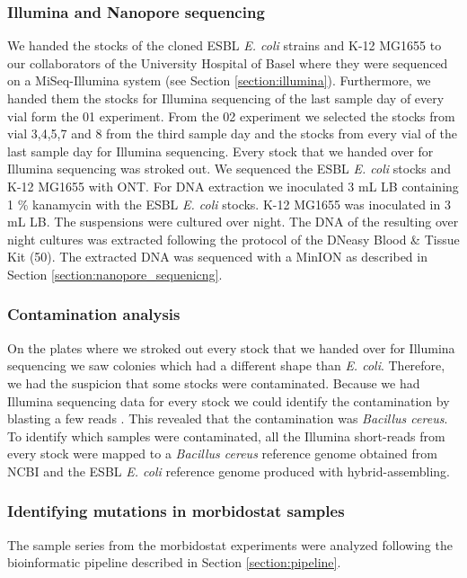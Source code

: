 \subsubsection{Illumina and Nanopore sequencing}
We handed the stocks of the cloned ESBL \textit{E. coli} strains and K-12 MG1655 to our collaborators of the University Hospital of Basel where they were sequenced on a MiSeq-Illumina system (see Section \ref{section:illumina}).
Furthermore, we handed them the stocks for Illumina sequencing of the last sample day of every vial form the 01 experiment. 
From the 02 experiment we selected the stocks from vial 3,4,5,7 and 8 from the third sample day and the stocks from every vial of the last sample day for Illumina sequencing. Every stock that we handed over for Illumina sequencing was stroked out. 
We sequenced the ESBL \textit{E. coli} stocks and K-12 MG1655 with ONT. For DNA extraction we inoculated 3 mL LB containing 1 \% kanamycin with the ESBL \textit{E. coli} stocks. K-12 MG1655 was inoculated in 3 mL LB. The suspensions were cultured over night. The DNA of the resulting over night cultures was extracted following the protocol of the DNeasy Blood \& Tissue Kit (50). The extracted DNA was sequenced with a MinION as described in Section \ref{section:nanopore_sequenicng}. 

\subsubsection{Contamination analysis}
On the plates where we stroked out every stock that we handed over for Illumina sequencing we saw colonies which had a different shape than \textit{E. coli}. Therefore, we had the suspicion that some stocks were contaminated. Because we had Illumina sequencing data for every stock we could identify the contamination by blasting a few reads \cite{madden_blast_2003}. This revealed that the contamination was \textit{Bacillus cereus}. To identify which samples were contaminated, all the Illumina short-reads from every stock  were mapped to a \textit{Bacillus cereus} reference genome obtained from NCBI \cite{noauthor_bacillus_nodate} and the ESBL \textit{E. coli} reference genome produced with hybrid-assembling.

\subsubsection{Identifying mutations in morbidostat samples}
The sample series from the morbidostat experiments were analyzed following the bioinformatic pipeline described in Section \ref{section:pipeline}. 